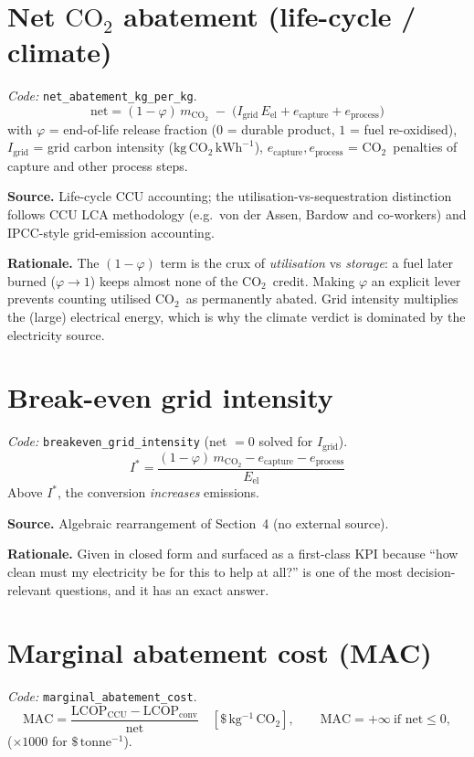 \documentclass[11pt,a4paper]{article}
\newcommand{\co}{\ensuremath{\mathrm{CO_2}}}
\newcommand{\kgi}{\mathrm{kg^{-1}}}
\begin{document}
\section{Net \texorpdfstring{\co}{CO2} abatement (life-cycle / climate)}
\emph{Code: }\texttt{net\_abatement\_kg\_per\_kg}.
\begin{equation}
\text{net} = (1-\varphi)\,m_{\co}
\;-\;\bigl(I_\mathrm{grid}\,E_\mathrm{el} + e_\mathrm{capture} + e_\mathrm{process}\bigr)
\end{equation}
with $\varphi$ = end-of-life release fraction ($0$ = durable product, $1$ = fuel
re-oxidised), $I_\mathrm{grid}$ = grid carbon intensity
($\mathrm{kg\,\co\,kWh^{-1}}$), $e_\mathrm{capture}, e_\mathrm{process}$ = \co\
penalties of capture and other process steps.

\textbf{Source.} Life-cycle CCU accounting; the utilisation-vs-sequestration
distinction follows CCU LCA methodology (e.g.\ von der Assen, Bardow and
co-workers) and IPCC-style grid-emission accounting.

\textbf{Rationale.} The $(1-\varphi)$ term is the crux of \emph{utilisation} vs
\emph{storage}: a fuel later burned ($\varphi\to 1$) keeps almost none of the \co\
credit. Making $\varphi$ an explicit lever prevents counting utilised \co\ as
permanently abated. Grid intensity multiplies the (large) electrical energy, which
is why the climate verdict is dominated by the electricity source.

\section{Break-even grid intensity}
\emph{Code: }\texttt{breakeven\_grid\_intensity} (net $=0$ solved for
$I_\mathrm{grid}$).
\begin{equation}
I^{*} = \frac{(1-\varphi)\,m_{\co} - e_\mathrm{capture} - e_\mathrm{process}}
{E_\mathrm{el}}
\end{equation}
Above $I^{*}$, the conversion \emph{increases} emissions.

\textbf{Source.} Algebraic rearrangement of Section~4 (no external source).

\textbf{Rationale.} Given in closed form and surfaced as a first-class KPI because
``how clean must my electricity be for this to help at all?'' is one of the most
decision-relevant questions, and it has an exact answer.

\section{Marginal abatement cost (MAC)}
\emph{Code: }\texttt{marginal\_abatement\_cost}.
\begin{equation}
\mathrm{MAC} = \frac{\mathrm{LCOP}_\mathrm{CCU} - \mathrm{LCOP}_\mathrm{conv}}
{\text{net}}\quad[\$\,\kgi\,\co], \qquad
\mathrm{MAC} = +\infty\ \text{if net} \le 0,
\end{equation}
($\times 1000$ for $\$\,\mathrm{tonne^{-1}}$).
\end{document}
